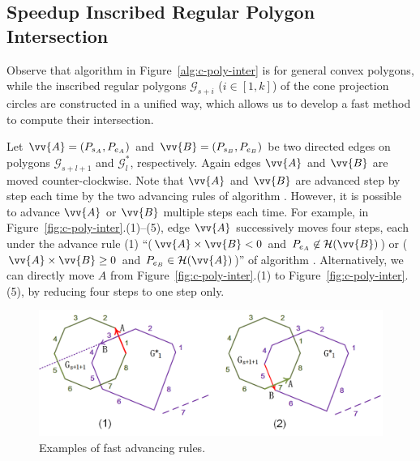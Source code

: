 \subsection{Speedup Inscribed Regular Polygon Intersection}
\label{subsec-fastRPI}


Observe that algorithm \cpia in Figure~\ref{alg:c-poly-inter} is for general convex polygons,
while the inscribed regular polygons $\mathcal{G}_{s+i}$ ($i\in[1, k]$) of the cone projection circles are constructed in a unified way,
which allows us to develop a fast method to compute their intersection.

Let $\vv{A} = (P_{s_A}, P_{e_A})$ and $\vv{B} = (P_{s_B}, P_{e_B})$  be two directed edges on polygons $\mathcal{G}_{s+l+1}$ and $\mathcal{G}^*_{l}$, respectively.
Again edges $\vv{A}$ and $\vv{B}$ are moved counter-clockwise. Note that $\vv{A}$ and $\vv{B}$ are advanced step by step each time by the two advancing rules of algorithm \cpia.
%
However, it is possible to advance $\vv{A}$ or $\vv{B}$ multiple steps each time.
%
For example, in Figure~\ref{fig:c-poly-inter}.(1)--(5), edge $\vv{A}$ successively moves four steps, each under the advance rule (1) ``($\vv{A} \times \vv{B} < 0$ and $P_{e_A} \not \in \mathcal{H}(\vv{B})$) or ($\vv{A} \times \vv{B} \ge 0$ and $P_{e_B} \in \mathcal{H}(\vv{A})$)'' of algorithm \cpia.
Alternatively, we can directly move $A$ from Figure~\ref{fig:c-poly-inter}.(1) to Figure~\ref{fig:c-poly-inter}.(5), by reducing four steps to one step only.

\begin{figure}[tb!]
\centering
\includegraphics[scale=0.86]{figures/Fig-r-poly-rule1.png}
\vspace{-5ex}
\caption{\small Examples of fast advancing rules.}
\vspace{-3ex}
\label{fig:r-poly-rule1}
\end{figure}



